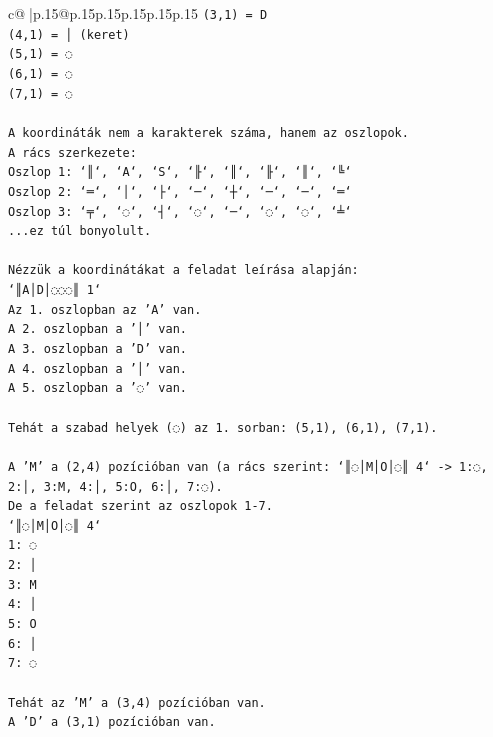 \documentclass{article}
\begin{document}
{\begin{supertabular}{c@{$\;$}|p{.15\linewidth}@{}p{.15\linewidth}p{.15\linewidth}p{.15\linewidth}p{.15\linewidth}p{.15\linewidth}}
{{{\texttt{(3,1) = D} \\
\texttt{(4,1) = │ (keret)} \\
\texttt{(5,1) = ◌} \\
\texttt{(6,1) = ◌} \\
\texttt{(7,1) = ◌} \\
\\ 
\texttt{A koordináták nem a karakterek száma, hanem az oszlopok.} \\
\texttt{A rács szerkezete:} \\
\texttt{Oszlop 1: `║`, `A`, `S`, `╟`, `║`, `╟`, `║`, `╚`} \\
\texttt{Oszlop 2: `═`, `│`, `├`, `─`, `┼`, `─`, `─`, `═`} \\
\texttt{Oszlop 3: `╤`, `◌`, `┤`, `◌`, `─`, `◌`, `◌`, `╧`} \\
\texttt{...ez túl bonyolult.} \\
\\ 
\texttt{Nézzük a koordinátákat a feladat leírása alapján:} \\
\texttt{`║A│D│◌◌◌║ 1`} \\
\texttt{Az 1. oszlopban az 'A' van.} \\
\texttt{A 2. oszlopban a '│' van.} \\
\texttt{A 3. oszlopban a 'D' van.} \\
\texttt{A 4. oszlopban a '│' van.} \\
\texttt{A 5. oszlopban a '◌' van.} \\
\\ 
\texttt{Tehát a szabad helyek (◌) az 1. sorban: (5,1), (6,1), (7,1).} \\
\\ 
\texttt{A 'M' a (2,4) pozícióban van (a rács szerint: `║◌│M│O│◌║ 4` {-}> 1:◌, 2:│, 3:M, 4:│, 5:O, 6:│, 7:◌).} \\
\texttt{De a feladat szerint az oszlopok 1{-}7.} \\
\texttt{`║◌│M│O│◌║ 4`} \\
\texttt{1: ◌} \\
\texttt{2: │} \\
\texttt{3: M} \\
\texttt{4: │} \\
\texttt{5: O} \\
\texttt{6: │} \\
\texttt{7: ◌} \\
\\ 
\texttt{Tehát az 'M' a (3,4) pozícióban van.} \\
\texttt{A 'D' a (3,1) pozícióban van.} \\
}}}
\end{supertabular}}
\end{document}
